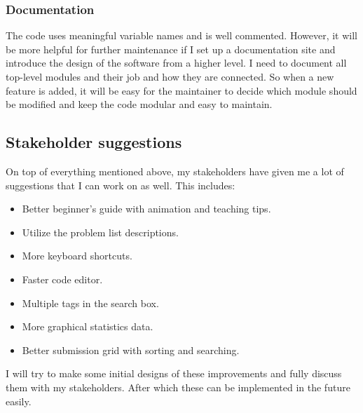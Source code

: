 \documentclass[report.tex]{subfiles}
\begin{document}
\subsubsection{Documentation}

The code uses meaningful variable names and is well commented. However, it will be more helpful for further maintenance if I set up a documentation site and introduce the design of the software from a higher level. I need to document all top-level modules and their job and how they are connected. So when a new feature is added, it will be easy for the maintainer to decide which module should be modified and keep the code modular and easy to maintain.

\subsection{Stakeholder suggestions}

On top of everything mentioned above, my stakeholders have given me a lot of suggestions that I can work on as well. This includes:

\begin{itemize}
  \item Better beginner's guide with animation and teaching tips.
  \item Utilize the problem list descriptions.
  \item More keyboard shortcuts.
  \item Faster code editor.
  \item Multiple tags in the search box.
  \item More graphical statistics data.
  \item Better submission grid with sorting and searching.
\end{itemize}

I will try to make some initial designs of these improvements and fully discuss them with my stakeholders. After which these can be implemented in the future easily.
\end{document}
